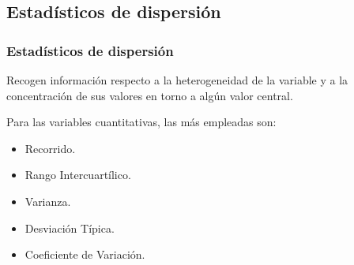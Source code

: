 \subsection{Estadísticos de dispersión}
\begin{frame}
\frametitle{Estadísticos de dispersión}
Recogen información respecto a la heterogeneidad de la variable y a la concentración de sus valores en torno a algún valor central.


Para las variables cuantitativas, las más empleadas son:
\begin{itemize}
\item Recorrido.
\item Rango Intercuartílico.
\item Varianza.
\item Desviación Típica.
\item Coeficiente de Variación.
\end{itemize}
\end{frame}


